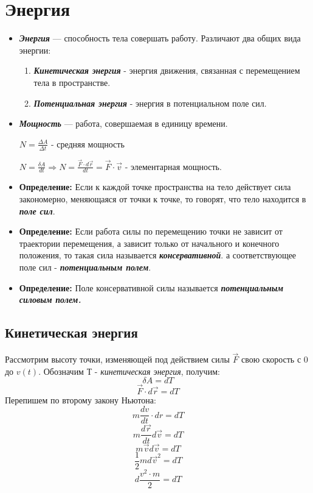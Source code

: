 \section{Энергия}
\begin{itemize}
    \item {} \textbf{\textit{Энергия}} --- способность тела совершать работу.
          Различают два общих вида энергии:
          \begin{enumerate}
              \item {} \textbf{\textit{Кинетическая энергия}} - энергия движения, связанная с перемещением тела в пространстве.
              \item {} \textbf{\textit{Потенциальная энергия}} - энергия в потенциальном поле сил.
          \end{enumerate}

    \item {} \textbf{\textit{Мощность}} --- работа, совершаемая в единицу времени.

          $N = \frac{\Delta A}{\Delta t}$ - средняя мощность

          $N = \frac{\delta A}{dt} \Rightarrow N = \frac{\vec F \cdot d\vec r}{dt} = \vec F \cdot \vec v$ - элементарная мощность.

    \item \textbf{Определение:} Если к каждой точке пространства на тело действует сила закономерно, меняющаяся от точки к точке, то говорят, что тело находится в \textbf{\textit{поле сил}}.

    \item \textbf{Определение:} Если работа силы по перемещению точки не зависит от траектории перемещения, а зависит только от начального и конечного положения, то такая сила называется \textbf{\textit{консервативной}}. а соответствующее поле сил - \textbf{\textit{потенциальным полем}}.

    \item \textbf{Определение:} Поле консервативной силы называется \textbf{\textit{потенциальным силовым полем.}}
\end{itemize}
\subsection{Кинетическая энергия}

Рассмотрим высоту точки, изменяющей под действием силы $\vec F$ свою скорость с 0 до $v(t)$. Обозначим Т - \textit{кинетическая энергия}, получим:
\[ \delta A = dT \]
\[ \vec F \cdot d \vec r  = dT\]
Перепишем по второму закону Ньютона:
\[ m\frac{dv}{dt} \cdot dr = dT \]
\[ m\frac{d \vec r}{dt} d\vec v = dT \] \[ m \vec v d \vec v = dT \]
\[ \frac{1}{2}md \vec v^2 = dT \]
\[ d\frac{v^2 \cdot m}{2} = dT\]

